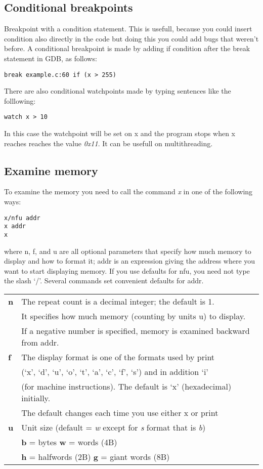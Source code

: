\subsection{Conditional breakpoints}
Breakpoint with a condition statement. This is usefull, because you could insert condition also directly in the code but doing this you could add bugs that weren't before. A conditional breakpoint is made by adding if condition after the break statement in GDB, as follows:
\begin{lstlisting}[linewidth=170pt, basicstyle=\footnotesize\sffamily,]
break example.c:60 if (x > 255)
\end{lstlisting}
There are also conditional watchpoints made by typing sentences like the folllowing:
\begin{lstlisting}[linewidth=60pt, basicstyle=\footnotesize\sffamily,]
watch x > 10
\end{lstlisting}
In this case the watchpoint will be set on x and the program stops when x reaches reaches the value \textit{0x11}. It can be usefull on multithreading.

\subsection{Examine memory}
To examine the memory you need to call the command \textit{x} in one of the following ways:
\begin{lstlisting}[linewidth=60pt, basicstyle=\footnotesize\sffamily,]
x/nfu addr
x addr
x
\end{lstlisting}
where n, f, and u are all optional parameters that specify how much memory to display and how to format it; addr is an expression giving the address where you want to start displaying memory. If you use defaults for nfu, you need not type the slash ‘/’. Several commands set convenient defaults for addr.
\begin{table}[h]
\footnotesize\centering
\begin{tabular}{|l|l|}
\hline
{\textbf{n}} & {The repeat count is a decimal integer; the default is 1.}\\
{} & {It specifies how much memory (counting by units u) to display.}\\
{} & {If a negative number is specified, memory is examined backward from addr.}\\
\hline
{\textbf{f}} & {The display format is one of the formats used by print}\\
{} & {(‘x’, ‘d’, ‘u’, ‘o’, ‘t’, ‘a’, ‘c’, ‘f’, ‘s’) and in addition ‘i’}\\
{} & {(for machine instructions). The default is ‘x’ (hexadecimal) initially.}\\
{} & {The default changes each time you use either x or print}\\
\hline
{\textbf{u}} & {Unit size (default = \textit{w} except for \textit{s} format that is \textit{b})}\\
{} & {\textbf{b} = bytes                \textbf{w} = words (4B)}\\
{} & {\textbf{h} = halfwords (2B)       \textbf{g} = giant words (8B)}\\
\hline
\end{tabular}
\end{table}


